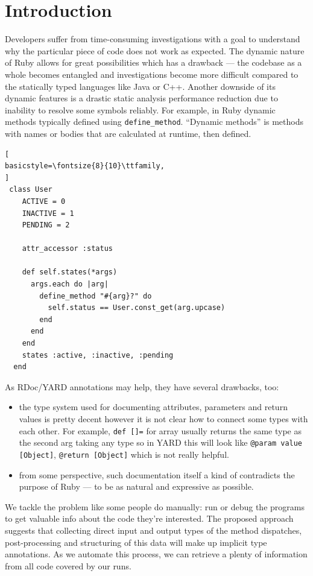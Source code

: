\documentclass[conference]{IEEEtran}
\begin{document}
\section{Introduction}
Developers suffer from time-consuming investigations with a goal to understand why the particular piece of code does not
work as expected. The dynamic nature of Ruby allows for great possibilities which has a drawback — the codebase as a
whole becomes entangled and investigations become more difficult compared to the statically typed languages like Java or
C++. Another downside of its dynamic features is a drastic static analysis performance reduction due to inability to
resolve some symbols reliably. For example, in Ruby dynamic methods typically defined using \texttt{define\_method}.
“Dynamic methods” is methods with names or bodies that are calculated at runtime, then defined\cite{gradual_type}.
\begin{lstlisting}[
basicstyle=\fontsize{8}{10}\ttfamily,
]
 class User
    ACTIVE = 0
    INACTIVE = 1
    PENDING = 2

    attr_accessor :status

    def self.states(*args)
      args.each do |arg|
        define_method "#{arg}?" do
          self.status == User.const_get(arg.upcase)
        end
      end
    end
    states :active, :inactive, :pending
  end
\end{lstlisting}
As RDoc/YARD annotations may help, they have several drawbacks, too:


\begin{itemize}  
\item the type system used for documenting attributes, parameters and return values is pretty decent however it is not
  clear how to connect some types with each other. For example, \texttt{def []=} for array usually returns the same type
    as the second arg taking any type so in YARD this will look like \texttt{@param value [Object]}, \texttt{@return
    [Object]} which is not really helpful.
\item from some perspective, such documentation itself a kind of contradicts the purpose of Ruby — to be as natural and
  expressive as possible. 
\end{itemize}

We tackle the problem like some people do manually: run or debug the programs to get valuable info about the code
they're interested. The proposed approach suggests that collecting direct input and output types of the method
dispatches, post-processing and structuring of this data will make up implicit type annotations. As we automate this
process, we can retrieve a plenty of information from all code covered by our runs.
\end{document}
